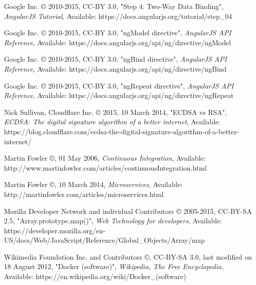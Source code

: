 \begin{thebibliography}{999}
\raggedright
Google Inc. © 2010-2015, CC-BY 3.0, "Step 4: Two-Way Data Binding",
{\em AngularJS Tutorial},
Available: https://docs.angularjs.org/tutorial/step\_04

\raggedright
Google Inc. © 2010-2015, CC-BY 3.0, "ngModel directive",
{\em AngularJS API Reference},
Available: https://docs.angularjs.org/api/ng/directive/ngModel

\raggedright
Google Inc. © 2010-2015, CC-BY 3.0, "ngBind directive",
{\em AngularJS API Reference},
Available: https://docs.angularjs.org/api/ng/directive/ngBind

\raggedright
Google Inc. © 2010-2015, CC-BY 3.0, "ngRepeat directive",
{\em AngularJS API Reference},
Available: https://docs.angularjs.org/api/ng/directive/ngRepeat

\raggedright
Nick Sullivan, Cloudflare Inc. © 2015, 10 March 2014, "ECDSA vs RSA",
{\em ECDSA: The digital signature algorithm of a better internet},
Available: https://blog.cloudflare.com/ecdsa-the-digital-signature-algorithm-of-a-better-internet/

\raggedright
Martin Fowler ©, 01 May 2006,
{\em Continuous Integration},
Available: http://www.martinfowler.com/articles/continuousIntegration.html

\raggedright
Martin Fowler ©, 10 March 2014,
{\em Microservices},
Available: http://martinfowler.com/articles/microservices.html

\raggedright
Mozilla Developer Network and individual Contributors © 2005-2015, CC-BY-SA 2.5, "Array.prototype.map()",
{\em Web Technology for developers},
Available: https://developer.mozilla.org/en-US/docs/Web/JavaScript/Reference/Global\_Objects/Array/map

\raggedright
Wikimedia Foundation Inc. and Contributors ©, CC-BY-SA 3.0,
last modified on 18 August 2012, "Docker (software)",
{\em Wikipedia, The Free Encyclopedia},
Available: https://en.wikipedia.org/wiki/Docker\_(software)

\end{thebibliography}
